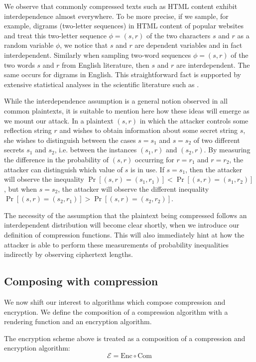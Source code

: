\documentclass[conference, letterpaper, 10pt]{IEEEtran}
\begin{document}
We observe that commonly compressed texts such as HTML content exhibit
interdependence almost everywhere. To be more precise, if we sample, for
example, digrams (two-letter sequences) in HTML content of popular websites and
treat this two-letter sequence $\phi = (s, r)$ of the two characters $s$ and
$r$ as a random variable $\phi$, we notice that $s$ and $r$ are dependent
variables and in fact interdependent. Similarly when sampling two-word sequences
$\phi = (s, r)$ of the two words $s$ and $r$ from English literature, then $s$
and $r$ are interdependent. The same occurs for digrams in English. This
straightforward fact is supported by extensive statistical analyses in the
scientific literature such as \cite{c18}.

While the interdependence assumption is a general notion observed in all common
plaintexts, it is suitable to mention here how these ideas will emerge as we
mount our attack. In a plaintext $(s, r)$ in which the attacker controls some
reflection string $r$ and wishes to obtain information about some secret string
$s$, she wishes to distinguish between the cases $s = s_1$ and $s = s_2$ of two
different secrets $s_1$ and $s_2$, i.e. between the instances $(s_1, r)$ and
$(s_2, r)$. By measuring the difference in the probability of $(s, r)$
occurring for $r = r_1$ and $r = r_2$, the attacker can distinguish which value
of $s$ is in use. If $s = s_1$, then the attacker will observe the inequality
$\Pr[(s, r) = (s_1, r_1)] < \Pr[(s, r) = (s_1, r_2)]$, but when $s = s_2$, the
attacker will observe the different inequality $\Pr[(s, r) = (s_2, r_1)] >
\Pr[(s, r) = (s_2, r_2)]$.

The necessity of the assumption that the plaintext being compressed follows an
interdependent distribution will become clear shortly, when we introduce our
definition of compression functions. This will also immediately hint at how the
attacker is able to perform these measurements of probability inequalities
indirectly by observing ciphertext lengths.

\subsection{Composing with compression}\label{subsec:comcompose}

We now shift our interest to algorithms which compose compression and
encryption. We define the composition of a compression algorithm with a
rendering function and an encryption algorithm.

The encryption scheme above is treated as a composition of a
compression and encryption algorithm:
\begin{equation*}
    \mathcal{E} = \textrm{Enc} \circ \textrm{Com}
\end{equation*}
\end{document}

